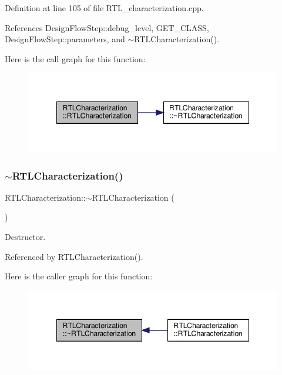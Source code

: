 Definition at line 105 of file R\+T\+L\+\_\+characterization.\+cpp.



References Design\+Flow\+Step\+::debug\+\_\+level, G\+E\+T\+\_\+\+C\+L\+A\+SS, Design\+Flow\+Step\+::parameters, and $\sim$\+R\+T\+L\+Characterization().

Here is the call graph for this function\+:
\nopagebreak
\begin{figure}[H]
\begin{center}
\leavevmode
\includegraphics[width=348pt]{d9/d84/classRTLCharacterization_af5d91dd2126f3d7352a05c9ff129d452_cgraph}
\end{center}
\end{figure}
\mbox{\label{classRTLCharacterization_a722fe030d54dd7f095e61b60d66e5d8f}} 
\subsubsection{\texorpdfstring{$\sim$\+R\+T\+L\+Characterization()}{~RTLCharacterization()}}
{\footnotesize\ttfamily R\+T\+L\+Characterization\+::$\sim$\+R\+T\+L\+Characterization (\begin{DoxyParamCaption}{ }\end{DoxyParamCaption})\hspace{0.3cm}{\ttfamily [default]}}



Destructor. 



Referenced by R\+T\+L\+Characterization().

Here is the caller graph for this function\+:
\nopagebreak
\begin{figure}[H]
\begin{center}
\leavevmode
\includegraphics[width=348pt]{d9/d84/classRTLCharacterization_a722fe030d54dd7f095e61b60d66e5d8f_icgraph}
\end{center}
\end{figure}


